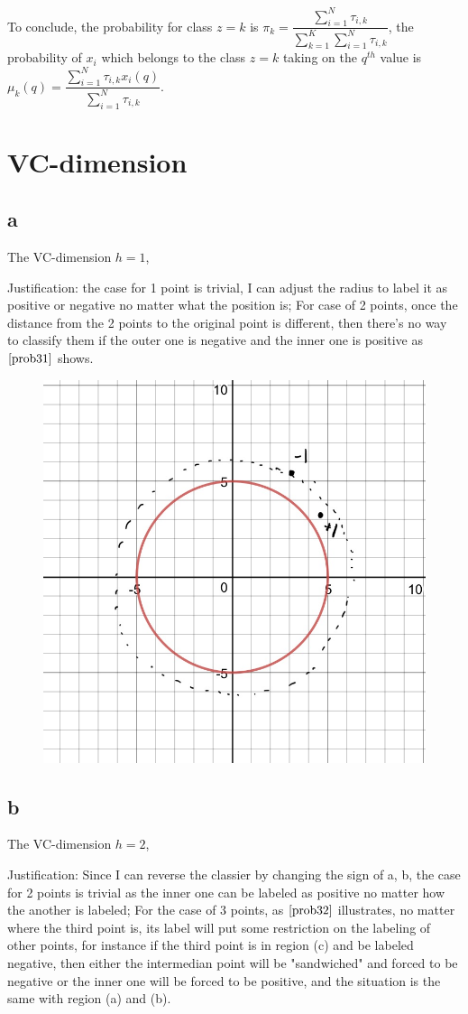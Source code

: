 \documentclass[a4paper,12pt]{article}
\begin{document}
To conclude, the probability for class $z = k$ is $ \pi_k = \dfrac{ \sum_{i = 1}^{N} \tau_{i,k}}{\sum_{k = 1}^{K}  \sum_{i = 1}^{N} \tau_{i,k}}$, the probability of $x_i$ which belongs to the class $z = k$ taking on the $q^{th}$ value is $\mu_k(q) = \dfrac{ \sum_{i = 1}^{N}\tau_{i,k} x_i(q)}{\sum_{i = 1}^{N}\tau_{i,k}  }$.

\section{VC-dimension}

\subsection{a}
The VC-dimension $h = 1$,

Justification: the case for 1 point is trivial, I can adjust the radius to label it as positive or negative no matter what the position is;
For case of 2 points, once the distance from the 2 points to the original point is different, then there's no way to classify them if the outer one is negative
and the inner one is positive as $\ref{prob31}$ shows.

\begin{figure}
    \centering
    \includegraphics[width = .6\textwidth]{prob31}
    \caption{}
    \label{prob31}
\end{figure}



\subsection{b}
The VC-dimension $h = 2$,

Justification: Since I can reverse the classier by changing the sign of a, b, the case for 2 points is trivial as the inner one can be labeled as positive no matter how the
another is labeled; For the case of 3 points, as $\ref{prob32}$ illustrates, no matter where the third point is, its label will put some restriction on the labeling of
other points, for instance if the third point is in region (c) and be labeled negative, then either the intermedian point will be "sandwiched" and forced to be negative
or the inner one will be forced to be positive, and the situation is the same with region (a) and (b).
\end{document}
